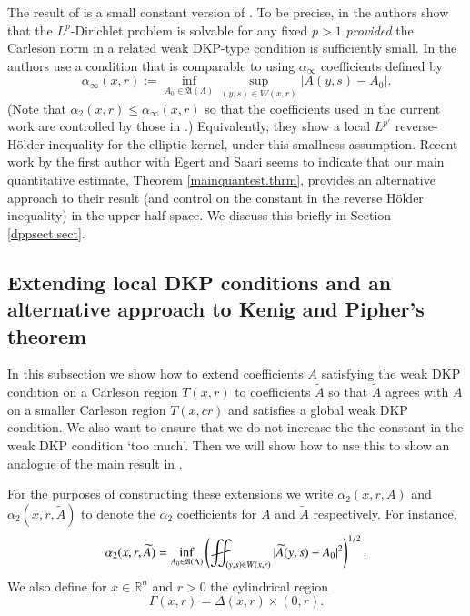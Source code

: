 \documentclass[11pt, a4paper,leqno]{amsart}
\def\Yint#1{\mathchoice
    {\YYint\displaystyle\textstyle{#1}}%
    {\YYint\textstyle\scriptstyle{#1}}%
    {\YYint\scriptstyle\scriptscriptstyle{#1}}%
    {\YYint\scriptscriptstyle\scriptscriptstyle{#1}}%
      \!\iint}
\def\YYint#1#2#3{{\setbox0=\hbox{$#1{#2#3}{\iint}$}
    \vcenter{\hbox{$#2#3$}}\kern-.51\wd0}}
\def\longdash{{-}\mkern-3.5mu{-}}
\def\tiltlongdash{\rotatebox[origin=c]{15}{$\longdash$}}
\def\fiint{\Yint\tiltlongdash}
\theoremstyle{plain}
\theoremstyle{definition}
\theoremstyle{remark}
\numberwithin{equation}{section}
\newcommand{\rn}{\mathbb{R}^n}
\def\Yint#1{\mathchoice
    {\YYint\displaystyle\textstyle{#1}}%
    {\YYint\textstyle\scriptstyle{#1}}%
    {\YYint\scriptstyle\scriptscriptstyle{#1}}%
    {\YYint\scriptscriptstyle\scriptscriptstyle{#1}}%
      \!\iint}
\def\YYint#1#2#3{{\setbox0=\hbox{$#1{#2#3}{\iint}$}
    \vcenter{\hbox{$#2#3$}}\kern-.51\wd0}}
\def\longdash{{-}\mkern-3.5mu{--}}
\def\tiltlongdash{\rotatebox[origin=c]{15}{$\longdash$}}
\def\fiint{\Yint\tiltlongdash}
\begin{document}
 
The result of \cite{DPP} is a small constant version of \cite{KP}. To be precise, in \cite{DPP} the authors show that the $L^p$-Dirichlet problem is solvable for any fixed $p > 1$ {\it provided} the Carleson norm in a related weak DKP-type condition is sufficiently small. In \cite{DPP} the authors use a condition that is comparable to using $\alpha_\infty$ coefficients defined by
\begin{equation}\label{def:oscinf}
	\alpha_\infty(x,r) := \inf_{A_0 \in \mathfrak{A}(\Lambda)}\sup_{(y,s) \in W(x,r)} |A(y,s) - A_0|.
\end{equation} 
(Note that $\alpha_2(x,r)  \le \alpha_\infty(x,r)$ so that the coefficients used in the current work are controlled by those in \cite{DPP}.)
Equivalently, they show a local $L^{p'}$ reverse-H\"older inequality for the elliptic kernel, under this smallness assumption. Recent work by the first author with Egert and Saari \cite{BES} seems to indicate that our main quantitative estimate, Theorem \ref{mainquantest.thrm}, provides an alternative approach to their result (and control on the constant in the reverse H\"older inequality) in the upper half-space. We discuss this briefly in Section \ref{dppsect.sect}.



\subsection{Extending local DKP conditions and an alternative approach to Kenig and Pipher's theorem}\label{kpsecondlook.sect} In this subsection we show how to extend coefficients $A$ satisfying the weak DKP condition on a Carleson region $T(x,r)$ to coefficients $\widetilde{A}$ so that $\widetilde{A}$ agrees with $A$ on a smaller Carleson region $T(x,cr)$ and satisfies a global weak DKP condition. We also want to ensure that we do not increase the the constant in the weak DKP condition `too much'. Then we will show how to use this to show an analogue of the main result in \cite{KP}.

For the purposes of constructing these extensions we write $\alpha_2(x,r,A)$ and $\alpha_2(x,r, \widetilde{A})$ to denote the $\alpha_2$ coefficients for $A$ and $\widetilde{A}$ respectively. For instance,
\[\alpha_2(x,r,\widetilde{A}) = \inf_{A_0 \in \mathfrak{A}(\Lambda)}\left(\fiint_{(y,s) \in W(x,r)} |\widetilde{A}(y,s) - A_0|^2 \right)^{1/2}.\]
We also define for $x \in \rn$ and $r > 0$ the cylindrical region
\[\Gamma(x,r) = \Delta(x,r) \times (0, r).\]
\end{document}
